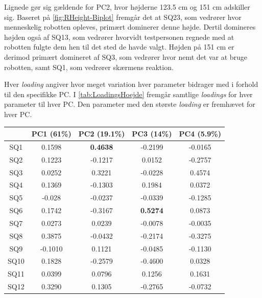 Lignede gør sig gældende for PC2, hvor højderne 123.5 cm og 151 cm adskiller sig. Baseret på \autoref{fig:RHeight-Biplot} fremgår det at SQ23, som vedrører hvor menneskelig robotten opleves, primært dominerer denne højde. Dertil domineres højden også af SQ13, som vedrører hvorvidt testpersonen regnede med at robotten fulgte dem hen til det sted de havde valgt. Højden på 151 cm er derimod primært domineret af SQ3, som vedrører hvor nemt det var at bruge robotten, samt SQ1, som vedrører skærmens reaktion. \blankline

Hver \textit{loading} angiver hvor meget variation hver parameter bidrager med i forhold til den specifikke PC. I \autoref{tab:LoadingsHoejde} fremgår samtlige \textit{loadings} for hver parameter til hver PC. Den parameter med den største \textit{loading} er fremhævet for hver PC.  
%
\begin{table}[H]
\centering
\begin{tabular}{c|c|c|c|c}
    & PC1 (61\%)      & PC2 (19.1\%)    & PC3 (14\%)      & PC4 (5.9\%)     \\ \hline
SQ1  & 0.1598          & \textbf{0.4638} & -0.2199         & -0.0165         \\ \hline
SQ2  & 0.1223          & -0.1217         & 0.0152          & -0.2757         \\ \hline
SQ3  & 0.0252          & 0.3221          & -0.0228         & 0.4574          \\ \hline
SQ4  & 0.1369          & -0.1303         & 0.1984          & 0.0372          \\ \hline
SQ5  & -0.028          & -0.0237         & -0.0339         & -0.1285         \\ \hline
SQ6  & 0.1742          & -0.3167         & \textbf{0.5274} & 0.0873          \\ \hline
SQ7  & 0.0273          & 0.0239          & -0.0078         & -0.0035         \\ \hline
SQ8  & 0.3875          & -0.0432         & -0.2174         & -0.3275         \\ \hline
SQ9  & -0.1010         & 0.1121          & -0.0485         & -0.1130          \\ \hline
SQ10 & 0.1828          & -0.2579         & -0.4600         & 0.0328          \\ \hline
SQ11 & 0.0399          & 0.0796          & 0.1256          & 0.1631          \\ \hline
SQ12 & 0.3290          & 0.1305          & -0.2765         & -0.0732         \\ \hline

\end{tabular}
\end{table}
